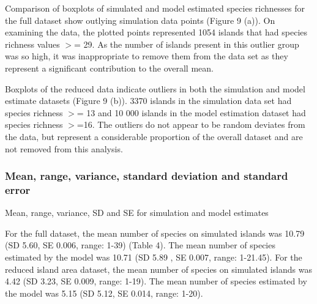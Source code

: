 \documentclass{article}
\begin{document}
\noindent Comparison of boxplots of simulated and model estimated species richnesses for the full dataset show outlying simulation data points (Figure 9 (a)). On examining the data, the plotted points represented 1054 islands that had species richness values $>$= 29. As the number of islands present in this outlier group was so high, it was inappropriate to remove them from the data set as they represent a significant contribution to the overall mean. \bigskip

\noindent Boxplots of the reduced data indicate outliers in both the simulation and model estimate datasets (Figure 9 (b)). 3370 islands in the simulation data set had species richness $>$= 13 and 10 000 islands in the model estimation dataset had species richness $>$=16. The outliers do not appear to be random deviates from the data, but represent a considerable proportion of the overall dataset and are not removed from this analysis.  

\subsubsection{Mean, range, variance, standard deviation and standard error}

\begin{table}[h!]
\caption{Mean, range, variance, SD and SE for simulation and model estimates}
\centering
{}
   \end{table}
    
\noindent For the full dataset, the mean number of species on simulated islands was 10.79 (SD 5.60, SE 0.006, range: 1-39) (Table 4).
The mean number of species estimated by the model was 10.71 (SD 5.89 , SE 0.007, range: 1-21.45). For the reduced island area dataset, the mean number of species on simulated islands was 4.42 (SD 3.23, SE 0.009, range: 1-19). The mean number of species estimated by the model was  5.15 (SD 5.12, SE 0.014, range: 1-20).
\end{document}
